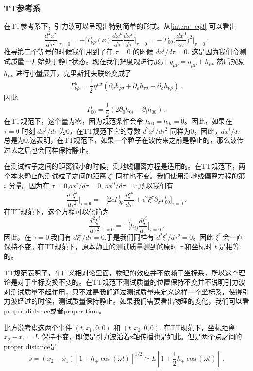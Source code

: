 \subsubsection{TT参考系}
在TT参考系下，引力波可以呈现出特别简单的形式。从\autoref{intera_eq3} 可以看出
\begin{equation}
\frac{d^2 x^i}{d\tau^2} \bigg|_{\tau = 0} = - \bigg[ \Gamma^i_{\nu\rho} (x) \frac{dx^\nu}{d\tau} \frac{dx^\rho}{d\tau} \bigg]_{\tau = 0} = - \bigg[ \Gamma^i_{00} \bigg( \frac{dx^0}{d\tau} \bigg)^2 \bigg]_{\tau = 0}~.
\end{equation}
推导第二个等号的时候我们用到了在 $\tau = 0$ 的时候 $dx^i/d\tau = 0$. 这是因为我们令测试质量一开始处于静止状态。现在我们把度规进行展开 $g_{\mu\nu} = \eta_{\mu\nu} + h_{\mu\nu}$ 然后按照 $h_{\mu\nu}$ 进行小量展开，克里斯托夫联络变成了
\begin{equation}
\Gamma^\mu_{\nu\rho} = \frac{1}{2} \eta^{\mu\sigma} (\partial_\nu h_{\rho\sigma} + \partial_\rho h_{\nu\sigma} - \partial_{\sigma} h_{\nu\rho}  )~. 
\end{equation}
因此
\begin{equation}
\Gamma^i_{00} = \frac{1}{2} (2\partial_0 h_{0i} - \partial_i h_{00}) ~.
\end{equation}
在TT规范下，这个量为零，因为规范条件会令 $h_{00} = h_{0i} = 0$。因此，如果在 $\tau = 0$ 时刻 $dx^i/d\tau$ 为0，在TT规范下它的导数 $d^2 x^i/d\tau^2$ 同样为0，因此，$dx^i/d\tau$ 总是为0.这表明，在TT规范下，如果一个粒子在波传来之前是静止的，那么波传过去之后也会同样保持静止。

在测试粒子之间的距离很小的时候，测地线偏离方程是适用的。在TT规范下，两个本来静止的测试粒子之间的距离 $\xi^i$ 同样也不变。我们使用测地线偏离方程的第 $i$ 分量。因为在 $\tau = 0$,$dx^i/d\tau = 0$, $dx^0/d\tau = c$,所以我们有
\begin{equation}
\frac{d^2\xi^i}{d\tau^2} \bigg|_{\tau = 0} = - \bigg[ 2 c \Gamma^i_{0\rho} \frac{d\xi^\rho}{d\tau} + c^2 \xi^\sigma \partial_\sigma \Gamma^i_{00} \bigg]_{\tau = 0}~.
\end{equation}
在TT规范下，这个方程可以化简为
\begin{equation}
\frac{d^2\xi^i}{d\tau^2}\bigg|_{\tau = 0} = - \bigg[ \dot{h}_{ij} \frac{d\xi^i}{d\tau} \bigg]_{\tau = 0}~. 
\end{equation}
因此，在 $\tau = 0$,我们有 $d\xi^i/d\tau = 0$,于是我们同样有 $d^2\xi^i/d\tau^2 = 0$。因此 $\xi^i$ 会一直保持不变。在TT规范下，原本静止的测试质量测到的原时 $\tau$ 和坐标时 $t$ 是相等的。

TT规范表明了，在广义相对论里面，物理的效应并不依赖于坐标系，所以这个理论是对于坐标变换不变的。在TT规范下测试质量的位置保持不变并不说明引力波对测试质量不起作用，只不过是我们通过测试质量来定义这样一个坐标系，使得引力波经过的时候，测试质量保持静止。如果我们需要看出物理的变化，我们可以看proper distance或者proper time。

比方说考虑这两个事件 $(t,x_1,0,0)$ 和 $(t,x_2,0,0)$. 在TT规范下，坐标距离 $x_2-x_1=L$ 保持不变，即使是引力波沿着z轴传播也是如此。但是两个点之间的proper distance是
\begin{equation}
s = (x_2-x_1)[1+h_+\cos(\omega t)]^{1/2} \simeq L[1+\frac{1}{2} h_+ \cos(\omega t) ] ~.
\end{equation}




